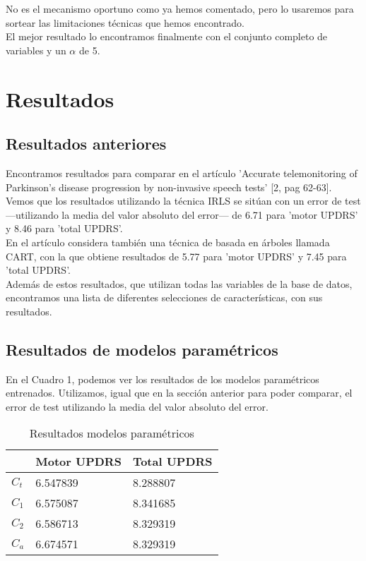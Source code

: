 No es el mecanismo oportuno como ya hemos comentado, pero lo usaremos para sortear las limitaciones técnicas que hemos encontrado.\\

El mejor resultado lo encontramos finalmente con el conjunto completo de variables y un $\alpha$ de 5.\\

\newpage

\section{Resultados}

\subsection{Resultados anteriores}
Encontramos resultados para comparar en el artículo 'Accurate telemonitoring of Parkinson’s disease progression by non-invasive speech tests' [2, pag 62-63]. Vemos que los resultados utilizando la técnica IRLS se sitúan con un error de test ---utilizando la media del valor absoluto del error--- de 6.71 para 'motor UPDRS' y 8.46 para 'total UPDRS'.\\

En el artículo considera también una técnica de basada en árboles llamada CART, con la que obtiene resultados de 5.77 para 'motor UPDRS' y 7.45 para 'total UPDRS'.\\

Además de estos resultados, que utilizan todas las variables de la base de datos, encontramos una lista de diferentes selecciones de características, con sus resultados.\\

\subsection{Resultados de modelos paramétricos}

En el Cuadro 1, podemos ver los resultados de los modelos paramétricos entrenados. Utilizamos, igual que en la sección anterior para poder comparar, el error de test utilizando la media del valor absoluto del error.\\

\begin{table}
\centering

\label{my-label}
\begin{tabular}{l|l|l|}
\cline{2-3}
                           & Motor UPDRS & Total UPDRS \\ \hline
\multicolumn{1}{|l|}{$C_t$} & 6.547839    & 8.288807    \\ \hline
\multicolumn{1}{|l|}{$C_1$} & 6.575087    & 8.341685    \\ \hline
\multicolumn{1}{|l|}{$C_2$} & 6.586713    & 8.329319    \\ \hline
\multicolumn{1}{|l|}{$C_a$} & 6.674571    & 8.329319    \\ \hline
\end{tabular}
\caption{Resultados modelos paramétricos}
\end{table}


